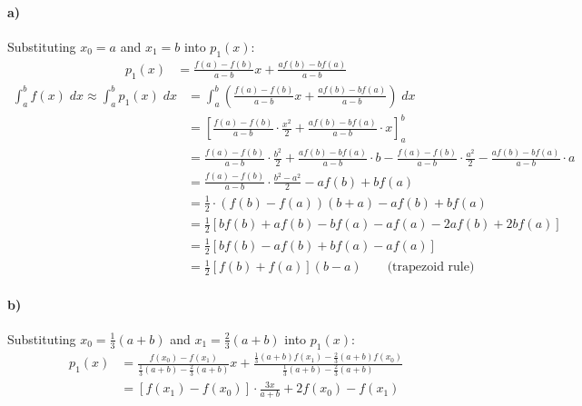 \documentclass[10pt,letter]{article}
\begin{document}
\paragraph{a)} Substituting $x_0 = a$ and $x_1 = b$ into $p_1(x)$:
\begin{align*}
p_1(x) &= \frac{f(a) - f(b)}{a - b} x + \frac{a f(b) - b f(a)}{a - b}
\end{align*}
\begin{align*}
\int_a^b f(x)\; dx \approx \int_a^b p_1(x)\; dx &= \int_a^b \left( \frac{f(a) - f(b)}{a - b} x + \frac{a f(b) - b f(a)}{a - b} \right) \; dx
\\
&= \left[ \frac{f(a) - f(b)}{a - b} \cdot \frac{x^2}{2} + \frac{a f(b) - b f(a)}{a - b} \cdot x \right]_a^b
\\
&= \frac{f(a) - f(b)}{a - b} \cdot \frac{b^2}{2} + \frac{a f(b) - b f(a)}{a - b} \cdot b
- \frac{f(a) - f(b)}{a - b} \cdot \frac{a^2}{2} - \frac{a f(b) - b f(a)}{a - b} \cdot a
\\
&= \frac{f(a) - f(b)}{a - b} \cdot \frac{b^2 - a^2}{2} - a f(b) + b f(a)
\\
&= \frac{1}{2} \cdot (f(b) - f(a))(b + a) - a f(b) + b f(a)
\\
&= \frac{1}{2} \left[ bf(b) + af(b) - b f(a) - a f(a) - 2 a f(b) + 2 b f(a) \right]
\\
&= \frac{1}{2} \left[ bf(b) - af(b) + b f(a) - a f(a) \right]
\\
&= \frac{1}{2} \left[ f(b) + f(a) \right]( b - a) \qquad \textrm{(trapezoid rule)}
\end{align*}

\paragraph{b)} Substituting $x_0 = \frac{1}{3}(a+b)$ and $x_1 = \frac{2}{3}(a+b)$ into $p_1(x)$:
\begin{align*}
p_1(x) &= \frac{f(x_0) - f(x_1)}{\frac{1}{3}(a + b) - \frac{2}{3}(a + b)} x + \frac{\frac{1}{3}(a + b) f(x_1) - \frac{2}{3}(a + b) f(x_0)}{\frac{1}{3}(a + b) - \frac{2}{3}(a + b)}
\\
&= \left[ f(x_1) - f(x_0) \right] \cdot \frac{3x}{a+b} + 2f(x_0) - f(x_1)
\end{align*}
\end{document}
